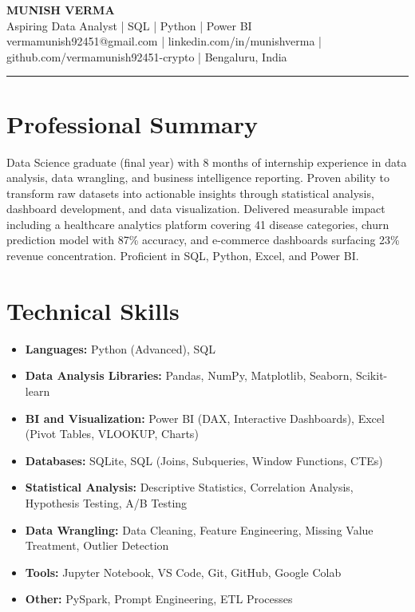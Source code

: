 \documentclass{article}
\begin{document}
\begin{center}
{\LARGE \textbf{MUNISH VERMA}} \\[4pt]
Aspiring Data Analyst | SQL | Python | Power BI \\[2pt]
vermamunish92451@gmail.com \quad | \quad linkedin.com/in/munishverma \quad | \quad github.com/vermamunish92451-crypto \quad | \quad Bengaluru, India
\end{center}

\rule{\textwidth}{0.4pt}

\section*{Professional Summary}
Data Science graduate (final year) with 8 months of internship experience in data analysis, data wrangling, and business intelligence reporting. Proven ability to transform raw datasets into actionable insights through statistical analysis, dashboard development, and data visualization. Delivered measurable impact including a healthcare analytics platform covering 41 disease categories, churn prediction model with 87\% accuracy, and e-commerce dashboards surfacing 23\% revenue concentration. Proficient in SQL, Python, Excel, and Power BI.

\section*{Technical Skills}
\begin{itemize}
    \item \textbf{Languages:} Python (Advanced), SQL
    \item \textbf{Data Analysis Libraries:} Pandas, NumPy, Matplotlib, Seaborn, Scikit-learn
    \item \textbf{BI and Visualization:} Power BI (DAX, Interactive Dashboards), Excel (Pivot Tables, VLOOKUP, Charts)
    \item \textbf{Databases:} SQLite, SQL (Joins, Subqueries, Window Functions, CTEs)
    \item \textbf{Statistical Analysis:} Descriptive Statistics, Correlation Analysis, Hypothesis Testing, A/B Testing
    \item \textbf{Data Wrangling:} Data Cleaning, Feature Engineering, Missing Value Treatment, Outlier Detection
    \item \textbf{Tools:} Jupyter Notebook, VS Code, Git, GitHub, Google Colab
    \item \textbf{Other:} PySpark, Prompt Engineering, ETL Processes
\end{itemize}
\end{document}
